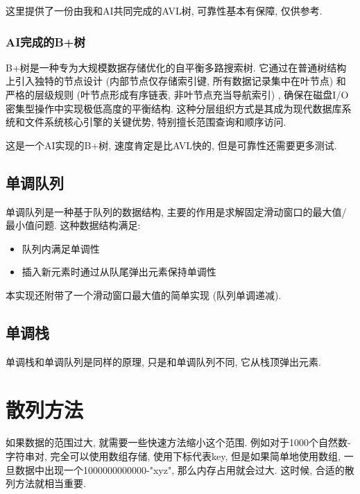\documentclass[a4paper]{ctexbook}
\begin{document}
这里提供了一份由我和AI共同完成的AVL树, 可靠性基本有保障, 仅供参考.



\subsection*{AI完成的B+树}

B+树是一种专为大规模数据存储优化的自平衡多路搜索树. 它通过在普通树结构上引入独特的节点设计 (内部节点仅存储索引键, 所有数据记录集中在叶节点) 和严格的层级规则 (叶节点形成有序链表, 非叶节点充当导航索引) , 确保在磁盘I/O密集型操作中实现极低高度的平衡结构. 这种分层组织方式是其成为现代数据库系统和文件系统核心引擎的关键优势, 特别擅长范围查询和顺序访问.

这是一个AI实现的B+树, 速度肯定是比AVL快的, 但是可靠性还需要更多测试.



\section{单调队列}
单调队列是一种基于队列的数据结构, 主要的作用是求解固定滑动窗口的最大值/最小值问题. 这种数据结构满足:
\begin{itemize}
	\item 队列内满足单调性
	\item 插入新元素时通过从队尾弹出元素保持单调性
\end{itemize}

本实现还附带了一个滑动窗口最大值的简单实现 (队列单调递减).



\section{单调栈}

单调栈和单调队列是同样的原理, 只是和单调队列不同, 它从栈顶弹出元素.



\chapter{散列方法}

如果数据的范围过大, 就需要一些快速方法缩小这个范围. 例如对于1000个自然数-字符串对, 完全可以使用数组存储, 使用下标代表key, 但是如果简单地使用数组, 一旦数据中出现一个1000000000000-"xyz", 那么内存占用就会过大. 这时候, 合适的散列方法就相当重要.
\end{document}

